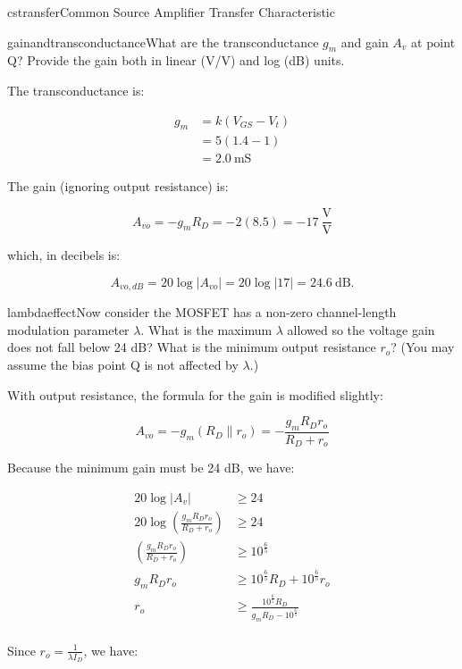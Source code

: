 \begin{mainquestion}{cstransfer}{Common Source Amplifier Transfer Characteristic}
\begin{partquestion}{gainandtransconductance}{What are the transconductance $g_{m}$ and gain $A_{v}$ at point Q? Provide the gain both in linear (V/V) and log (dB) units.}
\begin{answer}
The transconductance is:

\begin{align*}
    g_m &= k(V_{GS} - V_t) \\
    &= 5(1.4 - 1) \\
    &= \qty{2.0}{\milli\siemens}
\end{align*}

The gain (ignoring output resistance) is:

\[
A_{vo} = -g_{m} R_{D} = -2(8.5) = -17\ \frac{\text{V}}{\text{V}}
\]

which, in decibels is:

\[
A_{vo,dB} = 20\log|A_{vo}| = 20\log|17| = 24.6\ \text{dB}.
\]
\end{answer}
\end{partquestion}

\begin{partquestion}{lambdaeffect}{Now consider the MOSFET has a non-zero channel-length modulation parameter $\lambda$. What is the maximum $\lambda$ allowed so the voltage gain does not fall below 24 dB? What is the minimum output resistance $r_{o}$? (You may assume the bias point Q is not affected by $\lambda$.)  }
\begin{answer}
With output resistance, the formula for the gain is modified slightly:

\[
A_{vo} = -g_{m} \left(R_{D} \parallel r_{o}\right) = -\frac{g_{m} R_{D} r_{o}}{R_{D} + r_{o}}
\]

Because the minimum gain must be 24 dB, we have:

\begin{align*}
    20\log|A_v| &\geq 24 \\
    20\log\left(\frac{g_m R_D r_o}{R_D + r_o}\right) &\geq 24 \\
    \left(\frac{g_m R_D r_o}{R_D + r_o}\right) &\geq 10^\frac{6}{5} \\
    g_m R_D r_o &\geq 10^\frac{6}{5}R_D + 10^\frac{6}{5}r_o \\
    r_o &\geq \frac{10^\frac{6}{5}R_D}{g_m R_D - 10^\frac{6}{5}} \\
\end{align*}

Since $r_{o} = \frac{1}{\lambda I_{D}}$, we have:


\end{answer}
\end{partquestion}
\end{mainquestion}
